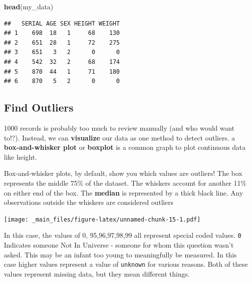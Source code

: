 \documentclass[
]{book}
\newenvironment{Shaded}{\begin{snugshade}}{\end{snugshade}}
\newcommand{\AttributeTok}[1]{\textcolor[rgb]{0.13,0.29,0.53}{#1}}
\newcommand{\FunctionTok}[1]{\textcolor[rgb]{0.13,0.29,0.53}{\textbf{#1}}}
\newcommand{\NormalTok}[1]{#1}
\newcommand{\SpecialCharTok}[1]{\textcolor[rgb]{0.81,0.36,0.00}{\textbf{#1}}}
\newcommand{\StringTok}[1]{\textcolor[rgb]{0.31,0.60,0.02}{#1}}
\begin{document}
\begin{Shaded}
\begin{Highlighting}[]
\FunctionTok{head}\NormalTok{(my\_data)}
\end{Highlighting}
\end{Shaded}

\begin{verbatim}
##   SERIAL AGE SEX HEIGHT WEIGHT
## 1    698  18   1     68    130
## 2    651  28   1     72    275
## 3    651   3   2      0      0
## 4    542  32   2     68    174
## 5    870  44   1     71    180
## 6    870   5   2      0      0
\end{verbatim}

\hypertarget{find-outliers}{%
\subsection{Find Outliers}\label{find-outliers}}

1000 records is probably too much to review manually (and who would want to!?). Instead, we can \textbf{visualize} our data as one method to detect outliers. a \textbf{box-and-whisker plot} or \textbf{boxplot} is a common graph to plot continuous data like height.

Box-and-whisker plots, by default, show you which values are outliers! The box represents the middle 75\% of the dataset. The whiskers account for another 11\% on either end of the box. The \textbf{median} is represented by a thick black line. Any observations outside the whiskers are considered outliers

\begin{Shaded}
\end{Shaded}

\texttt{[image: \_main\_files/figure-latex/unnamed-chunk-15-1.pdf]}

In this case, the values of 0, 95,96,97,98,99 all represent special coded values. \texttt{0} Indicates someone Not In Universe - someone for whom this question wasn't asked. This may be an infant too young to meaningfully be measured. In this case higher values represent a value of \texttt{unknown} for various reasons. Both of these values represent missing data, but they mean different things.
\end{document}
